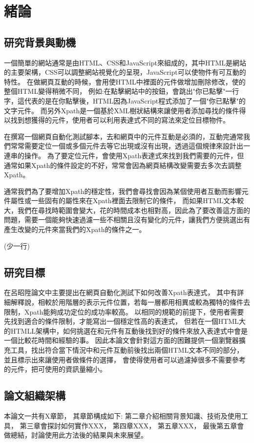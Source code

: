 \chapter{緒論}
\section{研究背景與動機}
\indent
一個簡單的網站通常是由HTML、CSS和JavaScript來組成的，其中HTML是網站的主要架構，CSS可以調整網站視覺化的呈現，JavaScript可以使物件有可互動的特性。
在做網頁互動的時候，會用使HTML中裡面的元件做增加刪除修改，使的整個HTML變得稍微不同，
例如:在點擊網站中的按鈕，會跳出"你已點擊"一行字，這代表的是在你點擊後，HTML因為JavaScript程式添加了一個"你已點擊"的文字元件。
而另外Xpath是一個基於XML樹狀結構來讓使用者添加尋找的條件得以找到想獲得的元件，使用者可以利用表達式不同的寫法來定位目標物件。

\indent
在撰寫一個網頁自動化測試腳本，去和網頁中的元件互動是必須的，互動完通常我們常常需要定位一個或多個元件去等它出現或沒有出現，透過這個規律來設計出一連串的操作。
為了要定位元件，會使用Xpath表達式來找到我們需要的元件，但通常如果Xpath的條件設定的不好，常常會因為網頁結構改變需要去多次去調整Xpath。

\indent
通常我們為了要增加Xpath的穩定性，我們會尋找會因為某個使用者互動而影響元件屬性或一些固有的屬性來在Xpath裡面去限制它的條件，
而如果HTML文本較大，我們在尋找時範圍會變大，花的時間成本也相對高，因此為了要改善這方面的問題，需要一個能夠快速過濾一些不相關且沒有變化的元件，讓我們方便挑選出有產生改變的元件來當我們的Xpath的條件之一。

\indent
(少一行)

\section{研究目標}
\indent
在呂昭陞論文中主要提出在網頁自動化測試下如何改善Xpath表達式，
其中有詳細解釋說，相較於用階層的表示元件位置，若每一層都用相異或較為獨特的條件去限制，Xpath能夠成功定位的成功率較高。
以相同的規範的前提下，使用者需要先找到適合的條件限制，才能寫出一個穩定性高的表達式，
但若在一個HTML大的HTMLL架構中，如何挑選在和元件有互動後找到好的條件來放入表達式中會是一個比較花時間和經驗的事。
因此本論文會針對這方面的困難提供一個瀏覽器擴充工具，找出符合當下情況中和元件互動前後找出兩個HTML文本不同的部分，並且標示出來讓使用者做條件的選擇，
會使得使用者可以過濾掉很多不需要參考的元件，把可使用的資訊量縮小。

\section{論文組織架構}
\indent
本論文一共有X章節，
其章節構成如下:
第二章介紹相關背景知識、技術及使用工具，
第三章會探討如何實作XXX，
第四章XXX，
第五章XXX，
最後第五章會做總結，討論使用此方法後的結果與未來展望。

